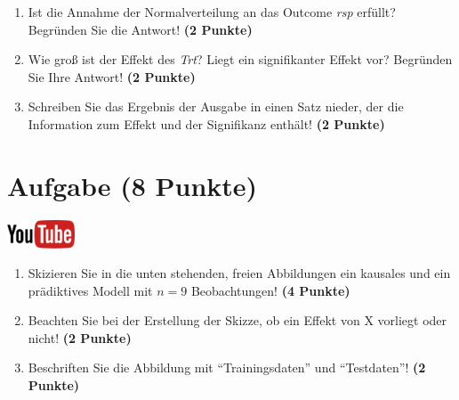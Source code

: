 \documentclass[a4paper, 10pt]{scrartcl}\usepackage[]{graphicx}\usepackage[]{xcolor}
\begin{document}
\begin{enumerate}
\item Ist die Annahme der Normalverteilung an das Outcome \textit{rsp} erf{\"u}llt?
  Begr{\"u}nden Sie die Antwort! \textbf{(2 Punkte)}
\item Wie gro{\ss} ist der Effekt des \textit{Trt}? Liegt ein signifikanter
  Effekt vor? Begr{\"u}nden Sie Ihre Antwort! \textbf{(2 Punkte)}
\item Schreiben Sie das Ergebnis der \Rlogo Ausgabe in einen Satz nieder, der die
  Information zum Effekt und der Signifikanz enth{\"a}lt! \textbf{(2 Punkte)} 
\end{enumerate}
 
\clearpage

\section{Aufgabe \hfill (8 Punkte)}

\hfill\href{https://youtu.be/C_a8aOMI7GE}{\includegraphics[width =
  2cm]{img/youtube}}\\[1Ex]



\begin{enumerate}
\item Skizieren Sie in die unten stehenden, freien Abbildungen ein kausales
  und ein pr{\"a}diktives Modell mit $n = 9$
  Beobachtungen! \textbf{(4 Punkte)}
\item Beachten Sie bei der Erstellung der Skizze, ob ein Effekt von X
  vorliegt oder nicht! \textbf{(2 Punkte)}
\item Beschriften Sie die Abbildung mit "`Trainingsdaten"' und "`Testdaten"'!  \textbf{(2 Punkte)}
\end{enumerate}
\end{document}

